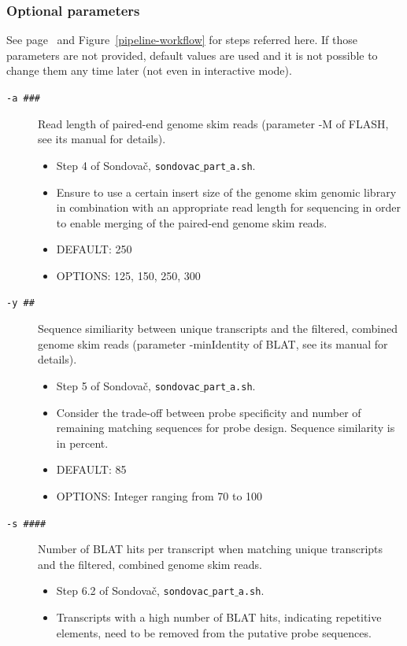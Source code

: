 \documentclass[a4paper, 11pt, twoside]{article}
\begin{document}
\subsubsection{Optional parameters}

See page~\pageref{pipeline-overview} and Figure~\ref{pipeline-workflow} for steps referred here. If those parameters are not provided, default values are used and it is not possible to change them any time later (not even in interactive mode).

\begin{description}
\item[\texttt{-a \#\#\#}] Read length of paired-end genome skim reads (parameter -M of FLASH, see its manual for details).
  \begin{itemize}
    \item Step 4 of Sondovač, \texttt{sondovac$\_$part$\_$a.sh}.
    \item Ensure to use a certain insert size of the genome skim genomic library in combination with an appropriate read length for sequencing in order to enable merging of the paired-end genome skim reads.
    \item DEFAULT: 250
    \item OPTIONS: 125, 150, 250, 300
  \end{itemize}
\item[\texttt{-y \#\#}] Sequence similiarity between unique transcripts and the filtered, combined genome skim reads (parameter -minIdentity of BLAT, see its manual for details).
  \begin{itemize}
    \item Step 5 of Sondovač, \texttt{sondovac$\_$part$\_$a.sh}.
    \item Consider the trade-off between probe specificity and number of remaining matching sequences for probe design. Sequence similarity is in percent.
    \item DEFAULT: 85
    \item OPTIONS: Integer ranging from 70 to 100
  \end{itemize}
\item[\texttt{-s \#\#\#\#}] Number of BLAT hits per transcript when matching unique transcripts and the filtered, combined genome skim reads.
  \begin{itemize}
    \item Step 6.2 of Sondovač, \texttt{sondovac$\_$part$\_$a.sh}.
    \item Transcripts with a high number of BLAT hits, indicating repetitive elements, need to be removed from the putative probe sequences.

\end{itemize}
\end{description}
\end{document}
